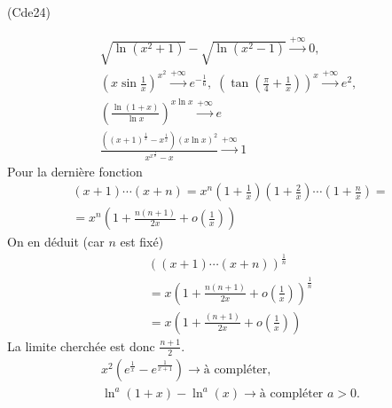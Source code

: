 \begin{tiny}(Cde24)\end{tiny}
\begin{multline*}
 \sqrt{\ln (x^{2}+1)}-\sqrt{\ln(x^{2}-1)} \xrightarrow{+\infty} 0 , \;\\
 \left( x\sin \frac{1}{x}\right)^{x^{2}} \xrightarrow{+\infty} e^{-\frac{1}{6}} , \;
 \left( \tan \left( \frac{\pi }{4}+\frac{1}{x}\right) \right) ^{x} \xrightarrow{+\infty} e^{2} , \; \\
 \left( \frac{\ln (1+x)}{\ln x}\right) ^{x\ln x} \xrightarrow{+\infty} e \\
\frac{\left( (x+1)^{\frac1x}-x^{\frac 1x}\right) \left( x\ln x\right) ^2}{x^{x^{\frac 1x}}-x} \xrightarrow{+\infty} 1 
\end{multline*}
Pour la dernière fonction
\begin{multline*}
  (x+1)\cdots(x+n) = x^n (1+\frac{1}{x})(1+\frac{2}{x})\cdots(1+\frac{n}{x})=\\
  =x^n\left(1 + \frac{n(n+1)}{2x} +o(\frac{1}{x})\right) 
\end{multline*}
On en déduit (car $n$ est fixé)
\begin{multline*}
\left((x+1)\cdots(x+n)\right)^\frac{1}{n} \\
= x\left(1 + \frac{n(n+1)}{2x} +o(\frac{1}{x})\right)^{\frac{1}{n}}\\
= x\left(1 + \frac{(n+1)}{2x} +o(\frac{1}{x})\right)
\end{multline*}
La limite cherchée est donc  $\frac{n+1}{2}$.
\begin{multline*}
 x^2\left( e^{\frac{1}{x}} - e^{\frac{1}{x+1}}\right) \rightarrow \text{à compléter}, \; \\
\ln^a(1+x) - \ln^a(x) \rightarrow \text{à compléter } a>0.
\end{multline*}
